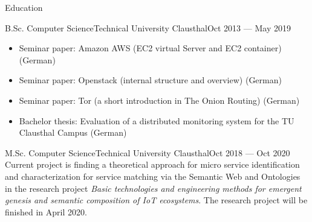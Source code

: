 \documentclass[]{mcdowellcv}
\begin{document}
\begin{cvsection}{Education}
\begin{cvsubsection}{B.Sc. Computer Science}{Technical University Clausthal}{Oct 2013 --- May 2019}
\begin{itemize}
	\item Seminar paper: Amazon AWS (EC2 virtual Server and EC2 container) (German) 
	\item Seminar paper: Openstack (internal structure and overview) (German) 
	\item Seminar paper: Tor (a short introduction in The Onion Routing) (German) 
	\item Bachelor thesis: Evaluation of a distributed monitoring system for the TU Clausthal Campus (German) 
\end{itemize}
\end{cvsubsection}
\begin{cvsubsection}{M.Sc. Computer Science}{Technical University Clausthal}{Oct 2018 --- Oct 2020}
Current project is finding a theoretical approach for micro service identification and characterization for service matching via the Semantic Web and Ontologies in the research project \textit{Basic technologies and engineering methods for emergent genesis and semantic composition of IoT ecosystems}. The research project will be finished in April 2020.
\end{cvsubsection}

\end{cvsection}
\end{document}
